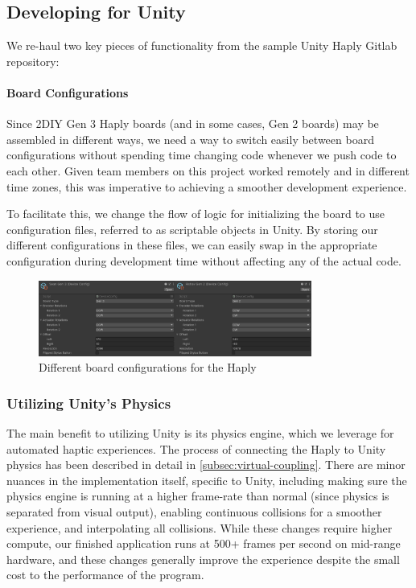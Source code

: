 \subsection{Developing for Unity}
We re-haul two key pieces of functionality from the sample Unity Haply Gitlab repository:
\paragraph{Board Configurations}
Since 2DIY Gen 3 Haply boards (and in some cases, Gen 2 boards) may be assembled in different ways, we need a way to switch easily between board configurations without spending time changing code whenever we push code to each other. Given team members on this project worked remotely and in different time zones, this was imperative to achieving a smoother development experience. 

To facilitate this, we change the flow of logic for initializing the board to use configuration files, referred to as scriptable objects in Unity. By storing our different configurations in these files, we can easily swap in the appropriate configuration during development time without affecting any of the actual code.

\begin{figure}
    \centering
    \includegraphics[width = 0.8\textwidth]{images/board-config.png}
    \caption{Different board configurations for the Haply}
    \label{fig:board-config}
\end{figure}

\subsubsection{Utilizing Unity's Physics}
The main benefit to utilizing Unity is its physics engine, which we leverage for automated haptic experiences. The process of connecting the Haply to Unity physics has been described in detail in \autoref{subsec:virtual-coupling}. There are minor nuances in the implementation itself, specific to Unity, including making sure the physics engine is running at a higher frame-rate than normal (since physics is separated from visual output), enabling continuous collisions for a smoother experience, and interpolating all collisions. While these changes require higher compute, our finished application runs at 500+ frames per second on mid-range hardware, and these changes generally improve the experience despite the small cost to the performance of the program.

